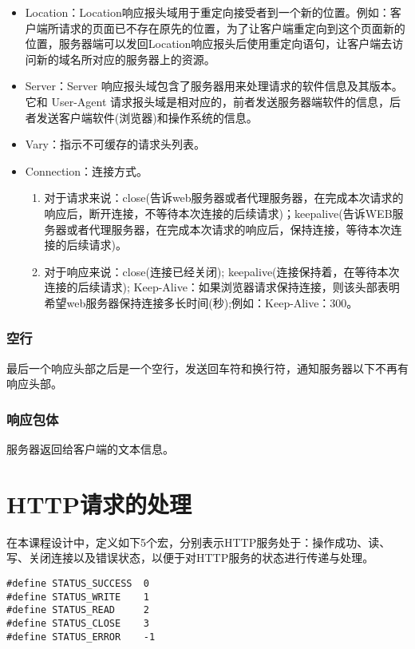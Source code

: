 \documentclass[bachelor]{thesis-uestc}
\begin{document}
\begin{itemize}
	\item Location：Location响应报头域用于重定向接受者到一个新的位置。例如：客户端所请求的页面已不存在原先的位置，为了让客户端重定向到这个页面新的位置，服务器端可以发回Location响应报头后使用重定向语句，让客户端去访问新的域名所对应的服务器上的资源。
	\item Server：Server 响应报头域包含了服务器用来处理请求的软件信息及其版本。它和 User-Agent 请求报头域是相对应的，前者发送服务器端软件的信息，后者发送客户端软件(浏览器)和操作系统的信息。
	\item Vary：指示不可缓存的请求头列表。
	\item Connection：连接方式。
	\begin{enumerate}
		\item 对于请求来说：close(告诉web服务器或者代理服务器，在完成本次请求的响应后，断开连接，不等待本次连接的后续请求)；keepalive(告诉WEB服务器或者代理服务器，在完成本次请求的响应后，保持连接，等待本次连接的后续请求)。
		\item 对于响应来说：close(连接已经关闭); keepalive(连接保持着，在等待本次连接的后续请求); Keep-Alive：如果浏览器请求保持连接，则该头部表明希望web服务器保持连接多长时间(秒);例如：Keep-Alive：300。
	\end{enumerate}
\end{itemize}

\subsubsection*{空行}

最后一个响应头部之后是一个空行，发送回车符和换行符，通知服务器以下不再有响应头部。

\subsubsection*{响应包体}

服务器返回给客户端的文本信息。

\section{HTTP请求的处理}
在本课程设计中，定义如下5个宏，分别表示HTTP服务处于：操作成功、读、写、关闭连接以及错误状态，以便于对HTTP服务的状态进行传递与处理。
\begin{lstlisting}
#define STATUS_SUCCESS	0
#define STATUS_WRITE	1
#define STATUS_READ		2
#define STATUS_CLOSE	3
#define STATUS_ERROR	-1
\end{lstlisting}
\end{document}

